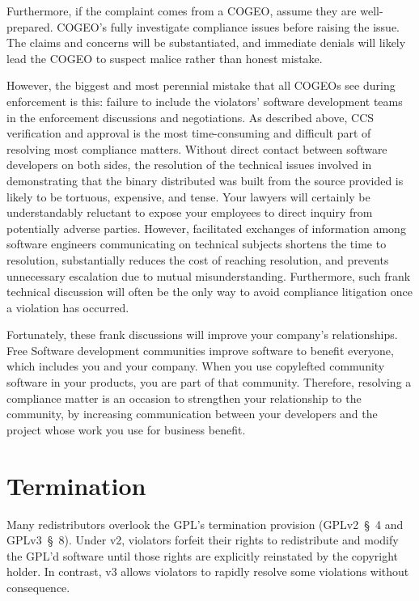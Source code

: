 Furthermore, if the complaint comes from a COGEO, assume they are
well-prepared.  COGEO's fully investigate compliance issues before raising
the issue.  The claims and concerns will be substantiated, and immediate
denials will likely lead the COGEO to suspect malice rather than honest
mistake.

However, the biggest and most perennial mistake that all COGEOs see during
enforcement is this: failure to include the violators' software development
teams in the enforcement discussions and negotiations.  As described above,
CCS verification and approval is the most time-consuming and difficult part
of resolving most compliance matters.  Without direct contact between
software developers on both sides, the resolution of the technical issues
involved in demonstrating that the binary distributed was built from the
source provided is likely to be tortuous, expensive, and tense. Your lawyers
will certainly be understandably reluctant to expose your employees to direct
inquiry from potentially adverse parties.  However, facilitated exchanges of
information among software engineers communicating on technical subjects
shortens the time to resolution, substantially reduces the cost of reaching
resolution, and prevents unnecessary escalation due to mutual
misunderstanding.  Furthermore, such frank technical discussion will often be
the only way to avoid compliance litigation once a violation has occurred.

Fortunately, these frank discussions will improve your company's
relationships.  Free Software development communities improve software to
benefit everyone, which includes you and your company.  When you use
copylefted community software in your products, you are part of that
community.  Therefore, resolving a compliance matter is an occasion to
strengthen your relationship to the community, by increasing communication
between your developers and the project whose work you use for business
benefit.

\section{Termination}

Many redistributors overlook the GPL's termination provision (GPLv2~\S~4 and
GPLv3~\S~8).  Under v2, violators forfeit their rights to redistribute and
modify the GPL'd software until those rights are explicitly reinstated by
the copyright holder.  In contrast, v3 allows violators to rapidly resolve
some violations without consequence.

